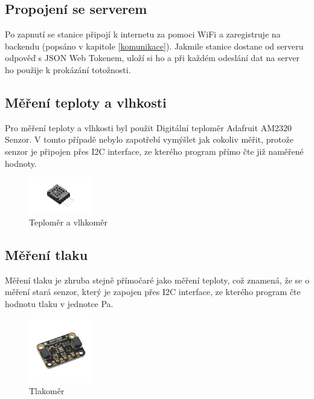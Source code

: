 \subsection{Propojení se serverem}
Po zapnutí se stanice připojí k internetu za pomoci WiFi a zaregistruje na backendu (popsáno v kapitole \ref{komunikace}). Jakmile stanice dostane od serveru odpověď s 
JSON Web Tokenem, uloží si ho a při každém odeslání dat na server ho použije k prokázání totožnosti.

\subsection{Měření teploty a vlhkosti}
Pro měření teploty a vlhkosti byl použit Digitální teploměr Adafruit AM2320 Senzor\cite{teplomer}. V tomto případě nebylo zapotřebí vymýšlet jak cokoliv měřit,
protože senzor je připojen přes I2C interface, ze kterého program přímo čte již naměřené hodnoty.
\begin{figure}[h] 
    \centering
    \includegraphics[width=0.25\textwidth]{images/Adafruit-AM2320.jpg}
    \caption{Teploměr a vlhkoměr}
\end{figure}

\subsection{Měření tlaku}
Měření tlaku je zhruba stejně přímočaré jako měření teploty, což znamená, že se o měření stará senzor\cite{tlakoměr},
který je zapojen přes I2C interface, ze kterého program čte hodnotu tlaku v jednotce Pa.

\begin{figure}[h] 
    \centering
    \includegraphics[width=0.25\textwidth]{images/Adafruit-BMP280.jpg}
    \caption{Tlakoměr}
\end{figure}
